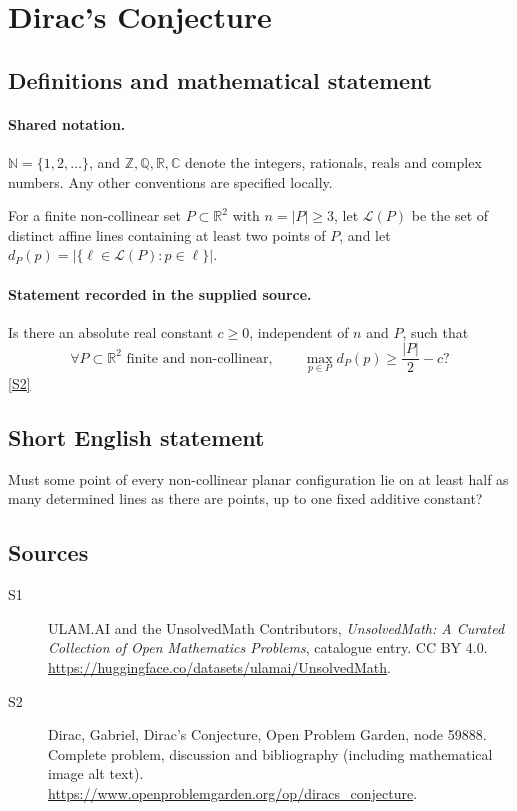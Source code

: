 \documentclass[11pt]{book}
\newcommand{\sref}[2]{\hyperlink{source:#1:#2}{[S#2]}}
\begin{document}
\section{Dirac's Conjecture}\label{statement}

\subsection{Definitions and mathematical statement}

\paragraph{Shared notation.}$\mathbb N=\{1,2,\ldots\}$, and $\mathbb Z,\mathbb Q,\mathbb R,\mathbb C$ denote the integers, rationals, reals and complex numbers. Any other conventions are specified locally.


For a finite non-collinear set $P\subset\mathbb R^2$ with $n=|P|\geq3$, let $\mathcal L(P)$ be the set of distinct affine lines containing at least two points of $P$, and let $d_P(p)=|\{\ell\in\mathcal L(P):p\in\ell\}|$.
\paragraph{Statement recorded in the supplied source.}
Is there an absolute real constant $c\geq0$, independent of $n$ and $P$, such that
\[\forall P\subset\mathbb R^2\text{ finite and non-collinear},\qquad\max_{p\in P}d_P(p)\geq \frac{|P|}{2}-c?\] \sref{statement}{2}
\subsection{Short English statement}
Must some point of every non-collinear planar configuration lie on at least half as many determined lines as there are points, up to one fixed additive constant?
\subsection{Sources}
\begin{description}
\item[\hypertarget{source:statement:1}{S1}] ULAM.AI and the UnsolvedMath Contributors, \emph{UnsolvedMath: A Curated Collection of Open Mathematics Problems}, catalogue entry. CC BY 4.0. \url{https://huggingface.co/datasets/ulamai/UnsolvedMath}.
\item[\hypertarget{source:statement:2}{S2}] Dirac, Gabriel, Dirac's Conjecture, Open Problem Garden, node 59888. Complete problem, discussion and bibliography (including mathematical image alt text). \url{https://www.openproblemgarden.org/op/diracs_conjecture}.
\end{description}
\label{end:statement}
\end{document}
